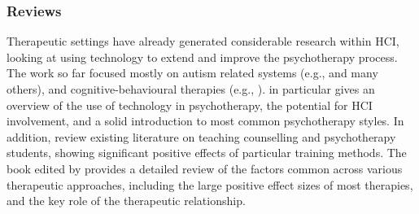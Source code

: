 \documentclass[prodmode,acmtochi]{acmsmall}
\newcommand{\Geraldine}[1]{\textrm{\textbf{\textcolor{Orange}{[[#1]]}}}}
\begin{document}
\subsubsection*{Reviews}
Therapeutic settings have already generated considerable research within
HCI,  looking at using technology to extend and improve the psychotherapy process. The work so far focused mostly on autism related systems (e.g.,
\cite{Escobedo2012,Picard2009,Hayes2011,Porayska-Pomsta2011,Hong2012} and many others), and cognitive-behavioural therapies (e.g., \cite{Coyle2011,Matthews2011}).  in particular gives an overview of the use of technology in psychotherapy, the potential for HCI involvement, and a solid introduction to most common psychotherapy styles.          
%
In addition,  review existing literature on teaching counselling and psychotherapy students, showing significant positive effects of particular training methods. The book edited by  provides a detailed review of the factors common across various therapeutic approaches, including the large positive effect sizes of most therapies, and the key role of the therapeutic relationship. 





\end{document}
